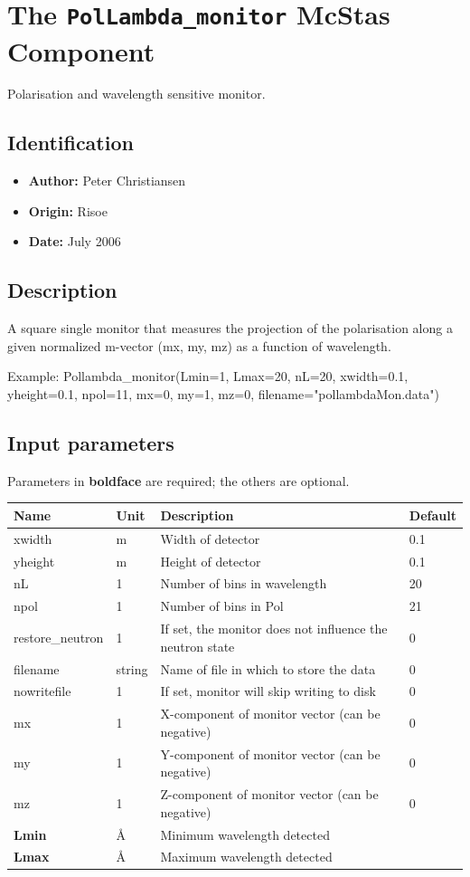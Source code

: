 \section{The \texttt{PolLambda\_monitor} McStas Component}
Polarisation and wavelength sensitive monitor.

\subsection*{Identification}
\begin{itemize}
  \item \textbf{Author:} Peter Christiansen
  \item \textbf{Origin:} Risoe
  \item \textbf{Date:} July 2006
\end{itemize}

\subsection*{Description}
A square single monitor that measures the projection of the polarisation along a given normalized m-vector (mx, my, mz) as a function of wavelength.

Example: Pollambda\_monitor(Lmin=1, Lmax=20, nL=20, xwidth=0.1, yheight=0.1, npol=11, mx=0, my=1, mz=0, filename="pollambdaMon.data")

\subsection*{Input parameters}
Parameters in \textbf{boldface} are required; the others are optional.

\begin{longtable}{p{}p{}p{}p{}}
\toprule
\textbf{Name} & \textbf{Unit} & \textbf{Description} & \textbf{Default} \\
\midrule
\endhead
xwidth & m & Width of detector & 0.1 \\
yheight & m & Height of detector & 0.1 \\
nL & 1 & Number of bins in wavelength & 20 \\
npol & 1 & Number of bins in Pol & 21 \\
restore\_neutron & 1 & If set, the monitor does not influence the neutron state & 0 \\
filename & string & Name of file in which to store the data & 0 \\
nowritefile & 1 & If set, monitor will skip writing to disk & 0 \\
mx & 1 & X-component of monitor vector (can be negative) & 0 \\
my & 1 & Y-component of monitor vector (can be negative) & 0 \\
mz & 1 & Z-component of monitor vector (can be negative) & 0 \\
\textbf{Lmin} & \AA{} & Minimum wavelength detected &  \\
\textbf{Lmax} & \AA{} & Maximum wavelength detected &  \\
\bottomrule
\end{longtable}

